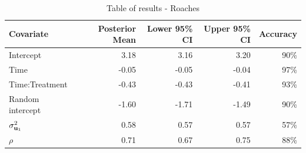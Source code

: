 \documentclass{article}[12pt]
\begin{document}

\begin{table}
\caption{Table of results - Roaches}
\label{tab:application_roaches}
\begin{tabular}{|l|rrrr|}
\hline
Covariate & Posterior Mean & Lower 95\% CI & Upper 95\% CI & Accuracy \\
\hline
Intercept & 3.18 & 3.16 & 3.20 & 90\% \\
Time & -0.05 & -0.05 & -0.04 & 97\% \\
Time:Treatment & -0.43 & -0.43 & -0.41 & 93\% \\
Random intercept & -1.60 & -1.71 & -1.49 & 90\% \\
$\sigma^2_{{\bf u}_1}$ & 0.58 & 0.57 & 0.57 & 57\% \\
$\rho$ & 0.71 & 0.67 & 0.75 & 88\% \\
\hline
\end{tabular}
\end{table}
\end{document}
